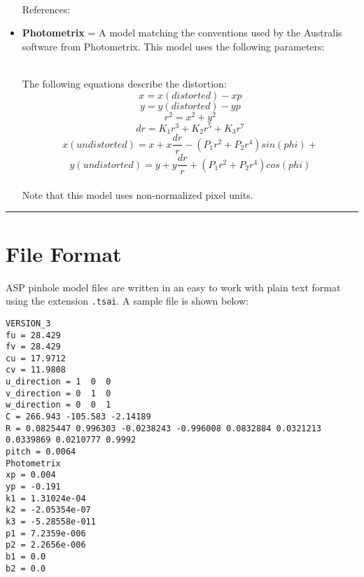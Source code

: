 \begin{itemize}{}
\hfill \\ References:

\item  \textbf{Photometrix} = A model matching the conventions used by the Australis software from Photometrix.
 This model uses the following parameters:
\hfill \\ The following equations describe the distortion:
\[ x = x(distorted) - xp \]
\[ y = y(distorted) - yp \]
\[ r^{2} = x^{2} + y^{2} \]
\[ dr = K_{1}r^{3} + K_{2}r^{5} + K_{3}r^{7} \]
\[ x(undistorted) = x + x\frac{dr}{r} - (P_{1}r^{2} +P_{2}r^{4})sin(phi) +  \]
\[ y(undistorted) = y + y\frac{dr}{r} + (P_{1}r^{2} +P_{2}r^{4})cos(phi) \]
\hfill \\ Note that this model uses non-normalized pixel units.

\end{itemize}

\hrule
\section{File Format}
\label{file_format}
\bigskip

ASP pinhole model files are written in an easy to work with plain text format 
using the extension \texttt{.tsai}.
A sample file is shown below:

\begin{verbatim}
VERSION_3
fu = 28.429
fv = 28.429
cu = 17.9712
cv = 11.9808
u_direction = 1  0  0
v_direction = 0  1  0
w_direction = 0  0  1
C = 266.943 -105.583 -2.14189
R = 0.0825447 0.996303 -0.0238243 -0.996008 0.0832884 0.0321213 0.0339869 0.0210777 0.9992
pitch = 0.0064
Photometrix
xp = 0.004
yp = -0.191
k1 = 1.31024e-04
k2 = -2.05354e-07
k3 = -5.28558e-011
p1 = 7.2359e-006
p2 = 2.2656e-006
b1 = 0.0
b2 = 0.0
\end{verbatim}

